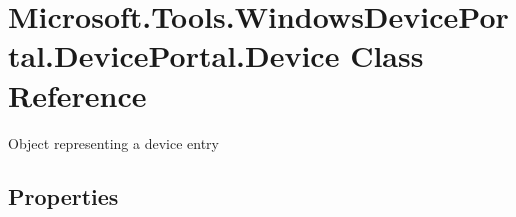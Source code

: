 \hypertarget{class_microsoft_1_1_tools_1_1_windows_device_portal_1_1_device_portal_1_1_device}{}\section{Microsoft.\+Tools.\+Windows\+Device\+Portal.\+Device\+Portal.\+Device Class Reference}
\label{class_microsoft_1_1_tools_1_1_windows_device_portal_1_1_device_portal_1_1_device}


Object representing a device entry  


\subsection*{Properties}
